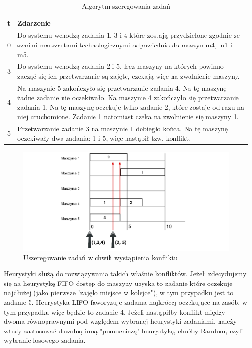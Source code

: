 \documentclass[twoside]{kInzynierka}
\begin{document}
\begin{table}[htb]
    \centering
    \caption{Algorytm szeregowania zadań}
    \begin{tabular}{ p{0.75cm} | p{13cm} }
    t & Zdarzenie \\ \hline
    0 & Do systemu wchodzą zadania 1, 3 i 4 które zostają przydzielone zgodnie ze swoimi marszrutami technologicznymi odpowiednio do maszyn m4, m1 i m5.  \\ \hline
    3 & Do systemu wchodzą zadania 2 i 5, lecz maszyny na których powinno zacząć się ich przetwarzanie są zajęte, czekają więc na zwolnienie maszyny. \\ \hline
    4 & Na maszynie 5 zakończyło się przetwarzanie zadania 4. Na tę maszynę żadne zadanie nie oczekiwało. Na maszynie 4 zakończyło się przetwarzanie zadania 1. Na tę maszynę oczekuje tylko zadanie 2, które zostaje od razu na niej uruchomione. Zadanie 1 natomiast czeka na zwolnienie się maszyny 1. \\ \hline
    5 & Przetwarzanie zadanie 3 na maszynie 1 dobiegło końca. Na tę maszynę oczekiwały dwa zadania: 1 i 5, więc nastąpił tzw. konflikt.   
    \end{tabular}
\end{table}

\begin{figure}[htb]
    \centering
    \includegraphics[width=\textwidth, keepaspectratio=true]{./obrazki/konf}
    \caption{Uszeregowanie zadań w chwili wystąpienia konfliktu}
\end{figure}

Heurystyki służą do rozwiązywania takich właśnie konfliktów. Jeżeli zdecydujemy się na heurystykę FIFO dostęp do maszyny uzyska to zadanie które oczekuje najdłużej (jako pierwsze "zajęło miejsce w kolejce"), w tym przypadku jest to zadanie 5. Heurystyka LIFO faworyzuje zadania najkrócej oczekujące na zasób, w tym przypadku więc będzie to zadanie 4. Jeżeli nastąpiłby konflikt między dwoma równoprawnymi pod względem wybranej heurystyki zadaniami, należy wtedy zastosować dowolną inną "pomocniczą" heurystykę, choćby Random, czyli wybranie losowego zadania.
\end{document}
